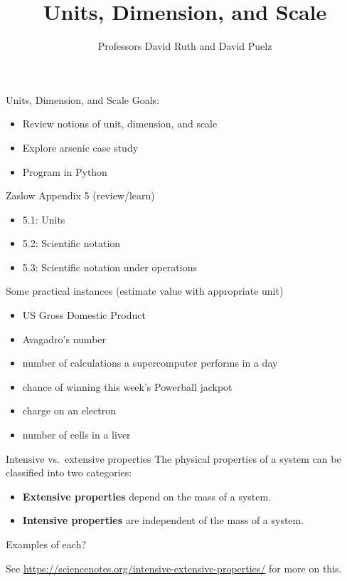 \documentclass[
  ignorenonframetext,
]{beamer}
\title{Units, Dimension, and Scale}
\author{Professors David Ruth and David Puelz}
\date{}
\institute{The University of Austin}
\begin{document}
\frame{\titlepage}

\begin{frame}{Units, Dimension, and Scale}
\label{units-dimension-and-scale}
Goals:

\begin{itemize}
\item
  Review notions of unit, dimension, and scale
\item
  Explore arsenic case study
\item
  Program in Python
\end{itemize}
\end{frame}

\begin{frame}{Zaslow Appendix 5 (review/learn)}
\label{zaslow-appendix-5-reviewlearn}
\begin{itemize}
\item
  5.1: Units
\item
  5.2: Scientific notation
\item
  5.3: Scientific notation under operations
\end{itemize}
\end{frame}

\begin{frame}{Some practical instances (estimate value with appropriate
unit)}
\label{some-practical-instances-estimate-value-with-appropriate-unit}
\begin{itemize}
\item
  US Gross Domestic Product
\item
  Avagadro's number
\item
  number of calculations a supercomputer performs in a day
\item
  chance of winning this week's Powerball jackpot
\item
  charge on an electron
\item
  number of cells in a liver
\end{itemize}
\end{frame}

\begin{frame}{Intensive vs.~extensive properties}
\label{intensive-vs.-extensive-properties}
The physical properties of a system can be classified into two
categories:

\begin{itemize}
\item
  \textbf{Extensive properties} depend on the mass of a system.
\item
  \textbf{Intensive properties} are independent of the mass of a system.
\end{itemize}

Examples of each?

\pause

See \url{https://sciencenotes.org/intensive-extensive-properties/} for
more on this.
\end{frame}
\end{document}
